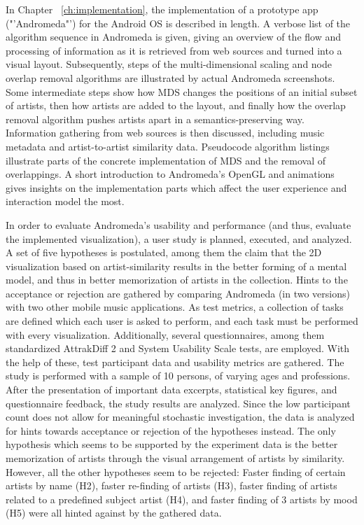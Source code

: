 In Chapter ~\ref{ch:implementation}, the implementation of a prototype app ("'Andromeda"') for the Android OS is described in length. A verbose list of the algorithm sequence in Andromeda is given, giving an overview of the flow and processing of information as it is retrieved from web sources and turned into a visual layout. Subsequently, steps of the multi-dimensional scaling and node overlap removal algorithms are illustrated by actual Andromeda screenshots. Some intermediate steps show how MDS changes the positions of an initial subset of artists, then how artists are added to the layout, and finally how the overlap removal algorithm pushes artists apart in a semantics-preserving way. Information gathering from web sources is then discussed, including music metadata and artist-to-artist similarity data. Pseudocode algorithm listings illustrate parts of the concrete implementation of MDS and the removal of overlappings. A short introduction to Andromeda's OpenGL and animations gives insights on the implementation parts which affect the user experience and interaction model the most.

In order to evaluate Andromeda's usability and performance (and thus, evaluate the implemented visualization), a user study is planned, executed, and analyzed. A set of five hypotheses is postulated, among them the claim that the 2D visualization based on artist-similarity results in the better forming of a mental model, and thus in better memorization of artists in the collection. Hints to the acceptance or rejection are gathered by comparing Andromeda (in two versions) with two other mobile music applications. As test metrics, a collection of tasks are defined which each user is asked to perform, and each task must be performed with every visualization. Additionally, several questionnaires, among them standardized AttrakDiff 2 and System Usability Scale tests, are employed. With the help of these, test participant data and usability metrics are gathered. The study is performed with a sample of 10 persons, of varying ages and professions. After the presentation of important data excerpts, statistical key figures, and questionnaire feedback, the study results are analyzed. Since the low participant count does not allow for meaningful stochastic investigation, the data is analyzed for hints towards acceptance or rejection of the hypotheses instead. The only hypothesis which seems to be supported by the experiment data is the better memorization of artists through the visual arrangement of artists by similarity. However, all the other hypotheses seem to be rejected: Faster finding of certain artists by name (H2), faster re-finding of artists (H3), faster finding of artists related to a predefined subject artist (H4), and faster finding of 3 artists by mood (H5) were all hinted against by the gathered data.

